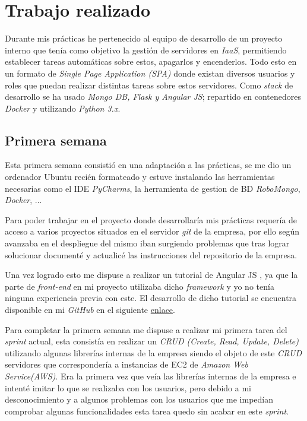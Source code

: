 \chapter{Trabajo realizado}

Durante mis prácticas he pertenecido al equipo de desarrollo de un proyecto interno que tenía como objetivo la gestión de servidores en \textit{IaaS}, permitiendo establecer tareas automáticas sobre estos, apagarlos y encenderlos. Todo esto en un formato de \textit{Single Page Application (SPA)} donde existan diversos usuarios y roles que puedan realizar distintas tareas sobre estos servidores. Como \textit{stack} de desarrollo se ha usado \textit{Mongo DB, Flask y Angular JS}; repartido en contenedores \textit{Docker} y utilizando \textit{Python 3.x}.

\section{Primera semana}

Esta primera semana consistió en una adaptación a las prácticas, se me dio un ordenador Ubuntu recién formateado y estuve instalando las herramientas necesarias como el IDE \textit{PyCharms}, la herramienta de gestion de BD \textit{RoboMongo}, \textit{Docker}, ... 

Para poder trabajar en el proyecto donde desarrollaría mis prácticas requería de acceso a varios proyectos situados en el servidor \textit{git} de la empresa, por ello según avanzaba en el despliegue del mismo iban surgiendo problemas que tras lograr solucionar documenté y actualicé las instrucciones del repositorio de la empresa.

Una vez logrado esto me dispuse a realizar un tutorial de Angular JS \cite{angular_js_tutorial}, ya que la parte de \textit{front-end} en mi proyecto utilizaba dicho \textit{framework} y yo no tenía ninguna experiencia previa con este. El desarrollo de dicho tutorial se encuentra disponible en mi \textit{GitHub} en el siguiente  \href{https://github.com/AythaE/AngularJS_Tutorial}{enlace}.

Para completar la primera semana me dispuse a realizar mi primera tarea del \textit{sprint} actual, esta consistía en realizar un \textit{CRUD (Create, Read, Update, Delete)} utilizando algunas librerías internas de la empresa siendo el objeto de este \textit{CRUD} servidores que correspondería a instancias de EC2 de \textit{Amazon Web Service(AWS)}. Era la primera vez que veía las librerías internas de la empresa e intenté imitar lo que se realizaba con los usuarios, pero debido a mi desconocimiento y a algunos problemas con los usuarios que me impedían comprobar algunas funcionalidades esta tarea quedo sin acabar en este \textit{sprint}.

